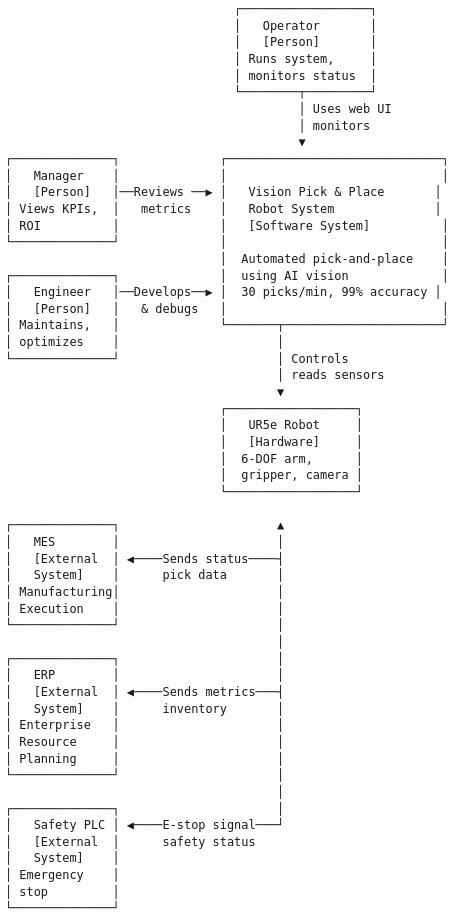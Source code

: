 \documentclass[
]{article}
\begin{document}
\begin{verbatim}
                                ┌──────────────────┐
                                │   Operator       │
                                │   [Person]       │
                                │ Runs system,     │
                                │ monitors status  │
                                └────────┬─────────┘
                                         │ Uses web UI
                                         │ monitors
                                         ▼
┌──────────────┐              ┌──────────────────────────────┐
│   Manager    │              │                              │
│   [Person]   │──Reviews ──▶ │   Vision Pick & Place       │
│ Views KPIs,  │   metrics    │   Robot System              │
│ ROI          │              │   [Software System]          │
└──────────────┘              │                              │
                              │  Automated pick-and-place    │
┌──────────────┐              │  using AI vision             │
│   Engineer   │──Develops──▶ │  30 picks/min, 99% accuracy │
│   [Person]   │   & debugs   │                              │
│ Maintains,   │              └───────┬──────────────────────┘
│ optimizes    │                      │
└──────────────┘                      │ Controls
                                      │ reads sensors
                                      ▼
                              ┌──────────────────┐
                              │   UR5e Robot     │
                              │   [Hardware]     │
                              │  6-DOF arm,      │
                              │  gripper, camera │
                              └──────────────────┘

┌──────────────┐                      ▲
│   MES        │                      │
│   [External  │ ◀────Sends status────┤
│   System]    │      pick data       │
│ Manufacturing│                      │
│ Execution    │                      │
└──────────────┘                      │
                                      │
┌──────────────┐                      │
│   ERP        │                      │
│   [External  │ ◀────Sends metrics───┤
│   System]    │      inventory       │
│ Enterprise   │                      │
│ Resource     │                      │
│ Planning     │                      │
└──────────────┘                      │
                                      │
┌──────────────┐                      │
│   Safety PLC │ ◀────E-stop signal───┘
│   [External  │      safety status
│   System]    │
│ Emergency    │
│ stop         │
└──────────────┘
\end{verbatim}
\end{document}

